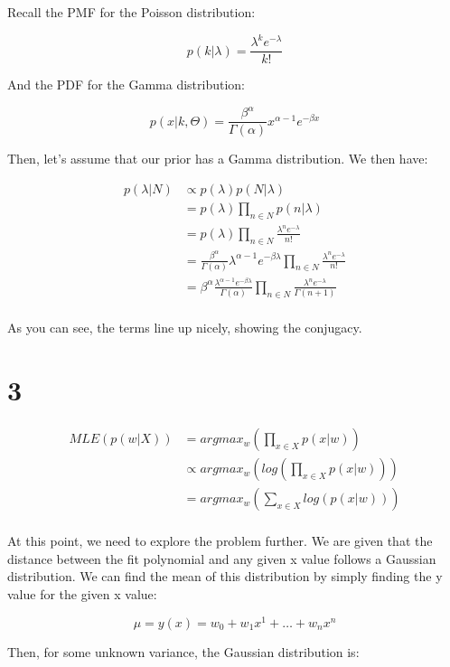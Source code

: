 \documentclass{article}
\begin{document}
Recall the PMF for the Poisson distribution:

$$
    p(k | \lambda) = \frac{\lambda^k e^{-\lambda}}{k!}
$$

And the PDF for the Gamma distribution:

$$
    p(x | k, \Theta) = \frac{\beta^{\alpha}}{\Gamma(\alpha)}x^{\alpha - 1} e^{-\beta x}
$$

Then, let's assume that our prior has a Gamma distribution. We then have:

\begin{align*}
    p(\lambda | N) &\propto p(\lambda) p(N | \lambda) \\
        &= p(\lambda) \prod_{n \in N} p(n | \lambda) \\
        &= p(\lambda) \prod_{n \in N} \frac{\lambda^n e^{-\lambda}}{n!} \\
        &= \frac{\beta^{\alpha}}{\Gamma(\alpha)}\lambda^{\alpha - 1} e^{-\beta \lambda} \prod_{n \in N} \frac{\lambda^n e^{-\lambda}}{n!} \\
        &= \beta^{\alpha} \frac{\lambda^{\alpha - 1}e^{-\beta \lambda}}{\Gamma(\alpha)} \prod_{n \in N} \frac{\lambda^n e^{-\lambda}}{\Gamma(n + 1)} \\
\end{align*}

As you can see, the terms line up nicely, showing the conjugacy.

\section{3}

\begin{align*}
    MLE(p(w | X)) &= argmax_w (\prod_{x \in X} p(x | w)) \\
        &\propto argmax_w (log(\prod_{x \in X} p(x | w))) \\
        &= argmax_w (\sum_{x \in X} log(p(x | w))) \\
\end{align*}

At this point, we need to explore the problem further. We are given that the 
distance between the fit polynomial and any given x value follows a Gaussian 
distribution. We can find the mean of this distribution by simply finding the 
y value for the given x value:

$$
\mu = y(x) = w_0 + w_1 x^1 + \dots + w_n x^n
$$

Then, for some unknown variance, the Gaussian distribution is:
\end{document}
